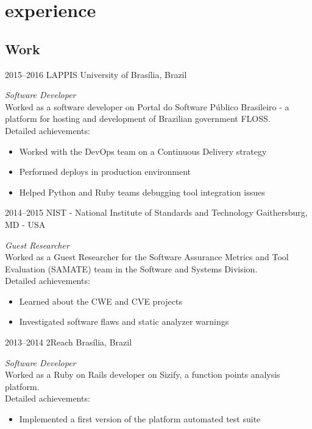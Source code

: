 \documentclass[print]{friggeri-cv}
\begin{document}

\section{experience}

\subsection{Work}

\begin{entrylist}


\entry
{2015--2016}
{LAPPIS}
{University of Brasília, Brazil}
{\emph{Software Developer} \\
  Worked as a software developer on Portal do Software Público
  Brasileiro - a platform for hosting and development of Brazilian government
  FLOSS. \\
Detailed achievements:
\begin{itemize}
  \item Worked with the DevOps team on a Continuous Delivery strategy
  \item Performed deploys in production environment
  \item Helped Python and Ruby teams debugging tool integration issues
\end{itemize}
  }


\entry
{2014--2015}
{NIST - National Institute of Standards and Technology}
{Gaithersburg, MD - USA}
{\emph{Guest Researcher} \\
  Worked as a Guest Researcher for the Software Assurance Metrics and Tool
  Evaluation (SAMATE) team in the Software and Systems Division. \\ Detailed
  achievements:
\begin{itemize}
\item Learned about the CWE and CVE projects
\item Investigated software flaws and static analyzer warnings
\end{itemize}
  }


\entry
{2013--2014}
{2Reach}
{Brasília, Brazil}
{\emph{Software Developer} \\
  Worked as a Ruby on Rails developer on Sizify, a function points analysis
  platform. \\
Detailed achievements:
\begin{itemize}
  \item Implemented a first version of the platform automated test suite
\end{itemize}}


\end{entrylist}
\end{document}
